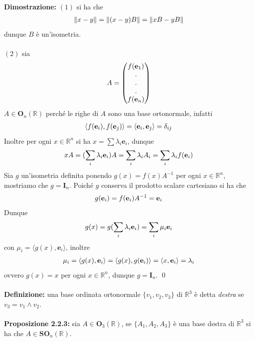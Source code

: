\documentclass{article}
\begin{document}
\textbf{Dimostrazione:} $(1)$ si ha che
\begin{gather}
    \| x - y \| = \| (x - y)B \| = \| xB - yB \| \notag
\end{gather}
dunque $B$ è un'isometria. \\ \\
$(2)$ sia
\begin{gather}
    A = \begin{pmatrix}
        f(\mathbf{e}_1) \\
        . \\
        . \\
        . \\
        f(\mathbf{e}_n)
    \end{pmatrix} \notag
\end{gather}
$A \in \mathbf{O}_n(\mathbb{R})$ perché le righe di $A$ sono una base ortonormale, infatti
\begin{gather}
    \langle f(\mathbf{e}_i), f(\mathbf{e}_j) \rangle = \langle \mathbf{e}_i, \mathbf{e}_j \rangle = \delta_{ij} \notag
\end{gather}
Inoltre per ogni $x \in \mathbb{R}^n$ si ha $x = \sum \lambda_i \mathbf{e}_i$, dunque
\begin{gather}
    xA = (\sum_i \lambda_i \mathbf{e}_i)A = \sum_i \lambda_i A_i = \sum_i \lambda_i f(\mathbf{e}_i) \notag
\end{gather}
Sia $g$ un'isometria definita ponendo $g(x) = f(x)A^{-1}$ per ogni $x \in \mathbb{R}^n$, mostriamo che $g = \mathbf{I}_n$. Poiché $g$ conserva il prodotto scalare cartesiano si ha che
\begin{gather}
    g(\mathbf{e}_i) = f(\mathbf{e}_i)A^{-1} = \mathbf{e}_i \notag
\end{gather}
Dunque
\begin{gather}
    g(x) = g(\sum_i \lambda_i \mathbf{e}_i) = \sum_i \mu_i \mathbf{e}_i \notag
\end{gather}
con $\mu_i = \langle g(x), \mathbf{e}_i \rangle$, inoltre
\begin{gather}
    \mu_i = \langle g(x), \mathbf{e}_i \rangle = \langle g(x), g(\mathbf{e}_i) \rangle = \langle x, \mathbf{e}_i \rangle = \lambda_i \notag 
\end{gather}
ovvero $g(x) = x$ per ogni $x \in \mathbb{R}^n$, dunque $g = \mathbf{I}_n$. \qed \\ \\
\textbf{Definizione:} una base ordinata ortonormale $\{ v_1, v_2, v_3 \}$ di $\mathbb{R}^3$ è detta \textit{destra} se $v_3 = v_1 \wedge v_2$. \\ \\
\textbf{Proposizione 2.2.3:} sia $A \in \mathbf{O}_3(\mathbb{R})$, se $\{ A_1, A_2, A_3 \}$ è una base destra di $\mathbb{R}^3$ si ha che $A \in \mathbf{SO}_n(\mathbb{R})$. \\
\end{document}
